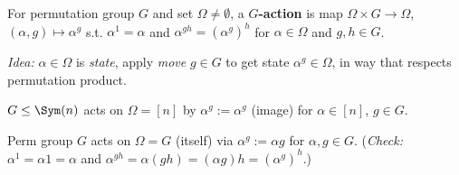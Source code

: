 \begin{slide}
    \begin{definition}
        \vspace{0pt}
        For permutation group $G$ and set $\Omega \neq \emptyset$, a \textbf{$G$-action} is map $\Omega \times G \to \Omega$, $(\alpha,g) \mapsto \alpha^g$ s.t. $\alpha^1 = \alpha$ and $\alpha^{gh} = (\alpha^g)^h$ for $\alpha \in \Omega$ and $g,h \in G$.
    \end{definition}

    \textit{Idea:} $\alpha \in \Omega$ is \textit{state}, apply \textit{move} $g \in G$ to get state $\alpha^g \in \Omega$, in way that respects permutation product. \pause

    \begin{example}
        \vspace{0pt}
        $G \leq \Sym(n)$ acts on $\Omega = [n]$ by $\alpha^g := \alpha^g$ (image) for $\alpha \in [n]$, $g \in G$.
    \end{example} \pause

    \begin{example}
        \vspace{0pt}
        Perm group $G$ acts on $\Omega = G$ (itself) via $\alpha^g := \alpha g$ for $\alpha,g \in G$. (\textit{Check:} $\alpha^1 = \alpha 1 = \alpha$ and $\alpha^{gh} = \alpha(gh) = (\alpha g)h = (\alpha^g)^h$.)
    \end{example}
\end{slide}

